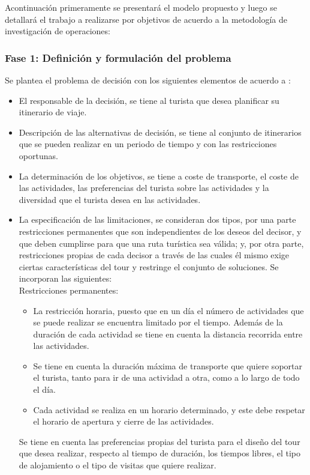 Acontinuación primeramente se presentará el modelo propuesto y luego se detallará el trabajo a realizarse por objetivos de acuerdo a la metodología de investigación de operaciones:
\subsubsection{Fase 1: Definición y formulación del problema}
Se plantea el problema de decisión con los siguientes elementos de acuerdo a : 
\begin{itemize}
    \item El responsable de la decisión, se tiene al turista que desea planificar su itinerario de viaje.
    \item Descripción de las alternativas de decisión, se tiene al conjunto de itinerarios que se pueden realizar en un periodo de tiempo y con las restricciones oportunas. 
    \item La determinación de los objetivos, se tiene a coste de transporte, el coste de las actividades, las preferencias del turista sobre las actividades y la diversidad que el turista desea en las actividades.
    \item La especificación de las limitaciones, se consideran dos tipos, por una parte restricciones permanentes que son independientes de los deseos del decisor, y que deben cumplirse para que una ruta turística sea válida; y, por otra parte, restricciones propias de cada decisor a través de las cuales él mismo exige ciertas características del tour y restringe el conjunto de soluciones. Se incorporan las siguientes:\\
    Restricciones permanentes:
    \begin{itemize}
        \item La restricción horaria, puesto que en un día el número de actividades que se puede realizar se encuentra limitado por el tiempo. Además de la duración de cada actividad se tiene en cuenta la distancia recorrida entre las actividades.
        \item Se tiene en cuenta la duración máxima de transporte que quiere soportar el turista, tanto para ir de una actividad a otra, como a lo largo de todo el día.
        \item Cada actividad se realiza en un horario determinado, y este debe respetar el horario de apertura y cierre de las actividades.
    \end{itemize}
    Se tiene en cuenta las preferencias propias del turista para el diseño del tour que desea realizar, respecto al tiempo de duración, los tiempos libres, el tipo de alojamiento o el tipo de visitas que quiere realizar. \\

\end{itemize}
